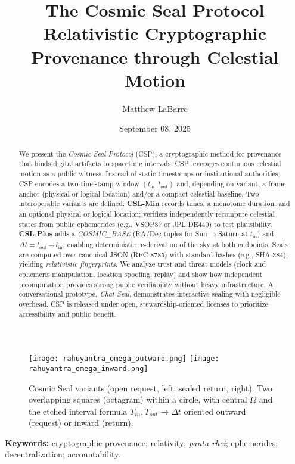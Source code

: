 \documentclass[11pt]{article}
\title{The Cosmic Seal Protocol\\
Relativistic Cryptographic Provenance through Celestial Motion}
\author[ ]{Matthew LaBarre}
\affil[ ]{Independent Researcher and Steward (Anchor Point)}
\affil[ ]{\texttt{csp@cbarl.org}}
\date{September 08, 2025} %
\begin{document}
\maketitle

\begin{abstract}
We present the \emph{Cosmic Seal Protocol} (CSP), a cryptographic method for provenance that binds digital artifacts to spacetime intervals. CSP leverages continuous celestial motion as a public witness. Instead of static timestamps or institutional authorities, CSP encodes a two-timestamp window $(t_{\text{in}}, t_{\text{out}})$ and, depending on variant, a frame anchor (physical or logical location) and/or a compact celestial baseline. Two interoperable variants are defined. \textbf{CSL-Min} records times, a monotonic duration, and an optional physical or logical location; verifiers independently recompute celestial states from public ephemerides (e.g., VSOP87 or JPL DE440) to test plausibility. \textbf{CSL-Plus} adds a \emph{COSMIC\_BASE} (RA/Dec tuples for Sun$\rightarrow$Saturn at $t_{\text{in}}$) and $\Delta t=t_{\text{out}}-t_{\text{in}}$, enabling deterministic re-derivation of the sky at both endpoints. Seals are computed over canonical JSON (RFC 8785) with standard hashes (e.g., SHA-384), yielding \emph{relativistic fingerprints}. We analyze trust and threat models (clock and ephemeris manipulation, location spoofing, replay) and show how independent recomputation provides strong public verifiability without heavy infrastructure. A conversational prototype, \emph{Chat Seal}, demonstrates interactive sealing with negligible overhead. CSP is released under open, stewardship-oriented licenses to prioritize accessibility and public benefit.
\end{abstract}
\begin{figure}[t]
  \centering
  \texttt{[image: rahuyantra\_omega\_outward.png]}\hfill
  \texttt{[image: rahuyantra\_omega\_inward.png]}
  \caption{Cosmic Seal variants (open request, left; sealed return, right). Two overlapping squares (octagram) within a circle, with central $\Omega$ and the etched interval formula $T_{in}, T_{out} \to \Delta t$ oriented outward (request) or inward (return).}
  \label{fig:csp-variants}
\end{figure}


\vspace{0.3em}
\noindent\textbf{Keywords:} cryptographic provenance; relativity; \emph{panta rhei}; ephemerides; decentralization; accountability.
\end{document}
